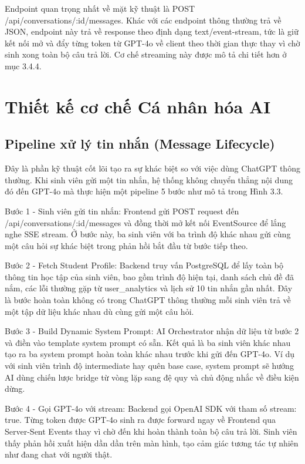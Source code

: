 \documentclass[../main.tex]{subfiles}
\begin{document}
Endpoint quan trọng nhất về mặt kỹ thuật là POST /\allowbreak api/\allowbreak conversations/\allowbreak :id/\allowbreak messages. Khác với các endpoint thông thường trả về JSON, endpoint này trả về response theo định dạng text/event-stream, tức là giữ kết nối mở và đẩy từng token từ GPT-4o về client theo thời gian thực thay vì chờ sinh xong toàn bộ câu trả lời. Cơ chế streaming này được mô tả chi tiết hơn ở mục 3.4.4.

\section{Thiết kế cơ chế Cá nhân hóa AI}

\subsection{Pipeline xử lý tin nhắn (Message Lifecycle)}

Đây là phần kỹ thuật cốt lõi tạo ra sự khác biệt so với việc dùng ChatGPT thông thường. Khi sinh viên gửi một tin nhắn, hệ thống không chuyển thẳng nội dung đó đến GPT-4o mà thực hiện một pipeline 5 bước như mô tả trong Hình 3.3.

Bước 1 - Sinh viên gửi tin nhắn: Frontend gửi POST request đến /\allowbreak api/\allowbreak conversations/\allowbreak :id/\allowbreak messages và đồng thời mở kết nối EventSource để lắng nghe SSE stream. Ở bước này, ba sinh viên với ba trình độ khác nhau gửi cùng một câu hỏi sự khác biệt trong phản hồi bắt đầu từ bước tiếp theo.

Bước 2 - Fetch Student Profile: Backend truy vấn PostgreSQL để lấy toàn bộ thông tin học tập của sinh viên, bao gồm trình độ hiện tại, danh sách chủ đề đã nắm, các lỗi thường gặp từ user\_analytics và lịch sử 10 tin nhắn gần nhất. Đây là bước hoàn toàn không có trong ChatGPT thông thường mỗi sinh viên trả về một tập dữ liệu khác nhau dù cùng gửi một câu hỏi.

Bước 3 - Build Dynamic System Prompt: AI Orchestrator nhận dữ liệu từ bước 2 và điền vào template system prompt có sẵn. Kết quả là ba sinh viên khác nhau tạo ra ba system prompt hoàn toàn khác nhau trước khi gửi đến GPT-4o. Ví dụ với sinh viên trình độ intermediate hay quên base case, system prompt sẽ hướng AI dùng chiến lược bridge từ vòng lặp sang đệ quy và chủ động nhắc về điều kiện dừng.

Bước 4 - Gọi GPT-4o với stream: Backend gọi OpenAI SDK với tham số stream: true. Từng token được GPT-4o sinh ra được forward ngay về Frontend qua Server-Sent Events thay vì chờ đến khi hoàn thành toàn bộ câu trả lời. Sinh viên thấy phản hồi xuất hiện dần dần trên màn hình, tạo cảm giác tương tác tự nhiên như đang chat với người thật.
\end{document}
